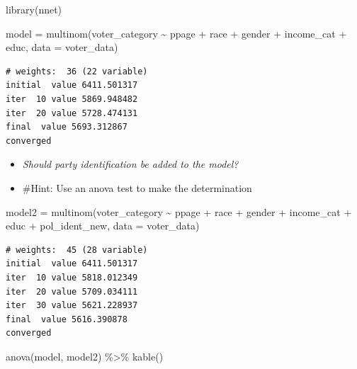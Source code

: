 \documentclass[
  letterpaper,
  DIV=11,
  numbers=noendperiod]{scrartcl}
\newenvironment{Shaded}{\begin{snugshade}}{\end{snugshade}}
\newcommand{\AttributeTok}[1]{\textcolor[rgb]{0.40,0.45,0.13}{#1}}
\newcommand{\FunctionTok}[1]{\textcolor[rgb]{0.28,0.35,0.67}{#1}}
\newcommand{\NormalTok}[1]{\textcolor[rgb]{0.00,0.23,0.31}{#1}}
\newcommand{\OtherTok}[1]{\textcolor[rgb]{0.00,0.23,0.31}{#1}}
\newcommand{\SpecialCharTok}[1]{\textcolor[rgb]{0.37,0.37,0.37}{#1}}
\providecommand{\tightlist}{%
  \setlength{\itemsep}{0pt}\setlength{\parskip}{0pt}}\usepackage{longtable,booktabs,array}
\begin{document}
\begin{Shaded}
\begin{Highlighting}[]
\FunctionTok{library}\NormalTok{(nnet)}

\NormalTok{model }\OtherTok{=} \FunctionTok{multinom}\NormalTok{(voter\_category }\SpecialCharTok{\textasciitilde{}}\NormalTok{ ppage }\SpecialCharTok{+}\NormalTok{ race }\SpecialCharTok{+}\NormalTok{ gender }\SpecialCharTok{+}\NormalTok{ income\_cat }\SpecialCharTok{+}\NormalTok{ educ, }
                     \AttributeTok{data =}\NormalTok{ voter\_data)}
\end{Highlighting}
\end{Shaded}

\begin{verbatim}
# weights:  36 (22 variable)
initial  value 6411.501317 
iter  10 value 5869.948482
iter  20 value 5728.474131
final  value 5693.312867 
converged
\end{verbatim}

\begin{itemize}
\tightlist
\item
  \emph{Should party identification be added to the model?}
\item
  \#Hint: Use an anova test to make the determination
\end{itemize}

\begin{Shaded}
\begin{Highlighting}[]
\NormalTok{model2 }\OtherTok{=} \FunctionTok{multinom}\NormalTok{(voter\_category }\SpecialCharTok{\textasciitilde{}}\NormalTok{ ppage }\SpecialCharTok{+}\NormalTok{ race }\SpecialCharTok{+}\NormalTok{ gender }\SpecialCharTok{+}\NormalTok{ income\_cat }\SpecialCharTok{+}\NormalTok{ educ }\SpecialCharTok{+}\NormalTok{ pol\_ident\_new, }
                     \AttributeTok{data =}\NormalTok{ voter\_data)}
\end{Highlighting}
\end{Shaded}

\begin{verbatim}
# weights:  45 (28 variable)
initial  value 6411.501317 
iter  10 value 5818.012349
iter  20 value 5709.034111
iter  30 value 5621.228937
final  value 5616.390878 
converged
\end{verbatim}

\begin{Shaded}
\begin{Highlighting}[]
\FunctionTok{anova}\NormalTok{(model, model2) }\SpecialCharTok{\%\textgreater{}\%} 
  \FunctionTok{kable}\NormalTok{()}
\end{Highlighting}
\end{Shaded}
\end{document}
